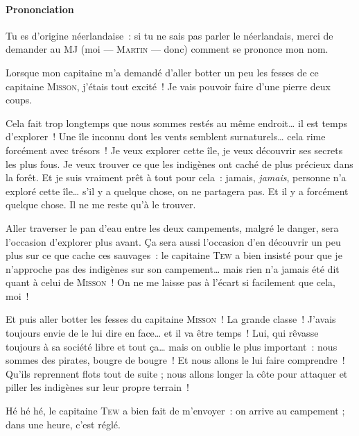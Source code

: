{
	\paragraph{Prononciation}{ Tu es d’origine néerlandaise~:  si tu ne sais pas parler le néerlandais, merci de demander au MJ (moi — \textsc{Martin} — donc) comment se prononce mon nom. }

		Lorsque mon capitaine m’a demandé d’aller botter un peu les fesses de ce capitaine \textsc{Misson}, j’étais tout excité~!
		Je vais pouvoir faire d’une pierre deux coups.

		Cela fait trop longtemps que nous sommes restés au même endroit… il est temps d’explorer~!
		Une île inconnu dont les vents semblent surnaturels… cela rime forcément avec trésors~!
		Je veux explorer cette île, je veux découvrir ses secrets les plus fous.
		Je veux trouver ce que les indigènes ont caché de plus précieux dans la forêt.
		Et je suis vraiment prêt à tout pour cela~:  jamais, \emph{jamais}, personne n’a exploré cette île… s’il y a quelque chose, on ne partagera pas.  Et il y a forcément quelque chose.  Il ne me reste qu’à le trouver.

		Aller traverser le pan d’eau entre les deux campements, malgré le danger, sera l’occasion d’explorer plus avant.
		Ça sera aussi l’occasion d’en découvrir un peu plus sur ce que cache ces sauvages~:  le capitaine \textsc{Tew} a bien insisté pour que je n’approche pas des indigènes sur son campement… mais rien n’a jamais été dit quant à celui de \textsc{Misson}~!
		On ne me laisse pas à l’écart si facilement que cela, moi~!

		Et puis aller botter les fesses du capitaine \textsc{Misson}~!  La grande classe~!
		J’avais toujours envie de le lui dire en face… et il va être temps~!
		Lui, qui rêvasse toujours à sa société libre et tout ça… mais on oublie le plus important~:  nous sommes des pirates, bougre de bougre~!
		Et nous allons le lui faire comprendre~!
		Qu’ils reprennent flots tout de suite ; nous allons longer la côte pour attaquer et piller les indigènes sur leur propre terrain~!

		Hé hé hé, le capitaine \textsc{Tew} a bien fait de m’envoyer~:  on arrive au campement ; dans une heure, c’est réglé.
}


